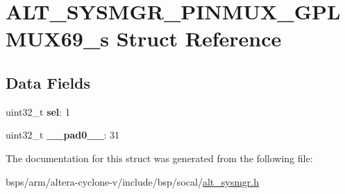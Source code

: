 \hypertarget{structALT__SYSMGR__PINMUX__GPLMUX69__s}{}\section{A\+L\+T\+\_\+\+S\+Y\+S\+M\+G\+R\+\_\+\+P\+I\+N\+M\+U\+X\+\_\+\+G\+P\+L\+M\+U\+X69\+\_\+s Struct Reference}
\label{structALT__SYSMGR__PINMUX__GPLMUX69__s}
\subsection*{Data Fields}
\begin{DoxyCompactItemize}
\item 
\mbox{\label{structALT__SYSMGR__PINMUX__GPLMUX69__s_a1c910f700e491e8b16be6022659f1c4b}} 
uint32\+\_\+t {\bfseries sel}\+: 1
\item 
\mbox{\label{structALT__SYSMGR__PINMUX__GPLMUX69__s_a4737d6c3017f19e5e2a5dcb53849560c}} 
uint32\+\_\+t {\bfseries \+\_\+\+\_\+pad0\+\_\+\+\_\+}\+: 31
\end{DoxyCompactItemize}


The documentation for this struct was generated from the following file\+:\begin{DoxyCompactItemize}
\item 
bsps/arm/altera-\/cyclone-\/v/include/bsp/socal/\mbox{\hyperlink{alt__sysmgr_8h}{alt\+\_\+sysmgr.\+h}}\end{DoxyCompactItemize}
